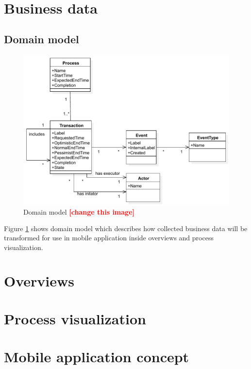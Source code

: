 \documentclass[thesis=B,english]{FITthesis}[2012/06/26]
\newcommand{\todo}[1]{\textcolor{red}{\textbf{[#1]}}}
\begin{document}
    \section{Business data}
    
    \subsection{Domain model}    
      \begin{figure}[ht!]
        \centering
        \includegraphics[width=12cm,keepaspectratio]{img/domain-core-model}
        \caption{Domain model \todo{change this image}}
        \label{fig:domain-core-model}
      \end{figure}    
      
      Figure \ref{fig:domain-core-model} shows domain model which describes how collected business data will be transformed for use in mobile application inside overviews and process visualization. 
    
    \section{Overviews}
    
    \section{Process visualization}
    
    \section{Mobile application concept}
	
\end{document}
